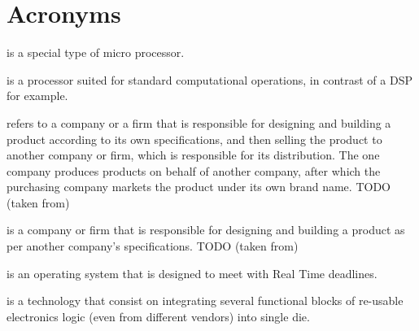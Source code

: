 \chapter{Acronyms}

\begin{acronym}

 is a special type of micro processor.


 is a processor suited for standard computational operations, in contrast of a \ac{DSP} for example.

 refers to a company or a firm that is responsible for designing and building a product according to its own specifications, and then selling the product to another company or firm, which is responsible for its distribution. The one company produces products on behalf of another company, after which the purchasing company markets the product under its own brand name. TODO (taken from)

 is a company or firm that is responsible for designing and building a product as per another company’s specifications. TODO (taken from)



 is an operating system that is designed to meet with Real Time deadlines.

 is a technology that consist on integrating several functional blocks of re-usable electronics logic (even from different vendors) into single die.


\end{acronym}

